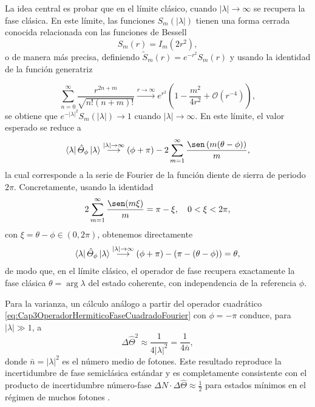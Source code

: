                La idea central es probar que en el límite clásico, cuando $|\lambda| \to \infty$ se recupera la fase clásica. En este límite, las funciones $S_m(|\lambda|)$ tienen una forma cerrada conocida relacionada con las funciones de Bessell \cite{cahill1969ordered}
                \begin{equation*}
                    S_m(r) = I_m(2r^2),
                \end{equation*}
                o de manera más precisa, definiendo $\tilde{S}_m(r) = e^{-r^2}S_m(r)$ y usando la identidad de la función generatriz

               \begin{equation}
                    \sum_{n=0}^{\infty} \frac{r^{2n+m}}{\sqrt{n!(n+m)!}} \overset{r\to \infty}{\longrightarrow} e^{r^2} \left(1 - \frac{m^2}{4r^2} + \mathcal{O}(r^{-4})\right),
               \end{equation}
               se obtiene que $e^{-|\lambda|^2}S_m(|\lambda|) \to 1$ cuando $|\lambda| \to \infty$. En este límite, el valor esperado se reduce a
               \begin{equation}
                    \bra{\lambda} \hat{\Theta}_\phi \ket{\lambda} \overset{|\lambda|\to \infty}{\longrightarrow} (\phi + \pi) - 2\sum_{m=1}^{\infty} \frac{\sen\left(m(\theta-\phi)\right)}{m},
               \end{equation} 
               la cual corresponde a la serie de Fourier de la función diente de sierra de periodo $2\pi$. Concretamente, usando la identidad
               \begin{equation}
                   2\sum_{m=1}^{\infty}\frac{\sen(m\xi)}{m} = \pi - \xi, \quad 0 < \xi < 2\pi,
               \end{equation}
               con $\xi = \theta - \phi \in (0,2\pi)$, obtenemos directamente
               \begin{equation}
                   \bra{\lambda}\hat{\Theta}_\phi\ket{\lambda} \overset{|\lambda|\to\infty}{\longrightarrow} (\phi+\pi) - \left(\pi - (\theta-\phi)\right) = \theta,
               \end{equation}
               de modo que, en el límite clásico, el operador de fase recupera exactamente la fase clásica $\theta = \arg\lambda$ del estado coherente, con independencia de la referencia $\phi$.

               Para la varianza, un cálculo análogo a partir del operador cuadrático \ref{eq:Cap3OperadorHermiticoFaseCuadradoFourier} con $\phi = -\pi$ conduce, para $|\lambda|\gg 1$, a
               \begin{equation}\label{eq:Cap3VarianzaCoherentes}
                   \Delta\hat{\Theta}^2 \approx \frac{1}{4|\lambda|^2} = \frac{1}{4\bar{n}},
               \end{equation}
               donde $\bar{n} = |\lambda|^2$ es el número medio de fotones. Este resultado reproduce la incertidumbre de fase semiclásica estándar y es completamente consistente con el producto de incertidumbre número-fase $\Delta N\cdot\Delta\hat{\Theta}\approx\frac{1}{2}$ para estados mínimos en el régimen de muchos fotones \cite{Barnett1989,Lynch1995}.

